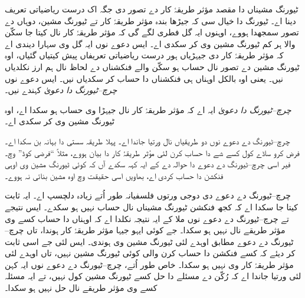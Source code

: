 \documentclass[../../../include/open-logic-section]{subfiles}
\begin{document}

ٹیورنگ مشیناں دا مقصد
مؤثر طریقۂ کار دے تصور
دی جگہ اک درست
ریاضیاتی تعریف دینا اے۔
ٹیورنگ دا خیال سی کہ
جیڑھا بندہ مؤثر طریقۂ کار
تے ٹیورنگ مشین، دوہاں
دے تصور سمجھدا ہووے،
اوہنوں ایہ گل فطری
لگے گی کہ مؤثر
طریقۂ کار نال کیتا
جا سکّن والا ہر
کم ٹیورنگ مشین وی
کر سکدی اے۔
ایس دعوے نوں ایہ گل
وی سہارا دیندی اے
کہ مؤثر طریقۂ کار
دی جیہڑیاں ہور
درست ریاضیاتی تعریفاں
پیش کیتیاں گئیاں،
اوہ ٹیورنگ مشین
دے تصور نال
حساب ہو سکّن والے فنکشناں دے لحاظ
نال ہم ارز نکلدیاں نیں۔ یعنی اوہ بالکل
اوہناں ہی فنکشناں
دا حساب کر سکدیاں
نیں۔ ایس دعوے
نوں \emph{چرچ--ٹیورنگ
دا دعویٰ} کہندے نیں۔

\begin{defn}
\emph{چرچ--ٹیورنگ دا دعویٰ}
ایہ اے کہ مؤثر طریقۂ کار
نال جیہڑا وی حساب ہو سکدا اے،
اوہ ٹیورنگ مشین وی کر سکدی اے۔
\end{defn}

چرچ--ٹیورنگ دے دعوے
نوں دو طریقیاں نال
ورتیا جاندا اے۔
پہلا طریقہ سستی
دا بہانہ بن سکدا اے۔
فرض کرو ساڈے کول
کسے شے دا حساب کرن
لئی مؤثر طریقۂ کار
دا بیان ہووے، مثلاً
“فرضی کوڈ” وچ۔
فیر اسی چرچ--ٹیورنگ
دے دعوے دا حوالہ
دے کے ایہ کہہ
سکدے آں کہ کوئی
ٹیورنگ مشین وی
اوہی فنکشن دا حساب
کردی اے، بھاویں
اسی حقیقت وچ اوہ
مشین بنائی نہ ہووے۔

چرچ--ٹیورنگ دے دعوے
دی دوجی ورتوں فلسفیانہ
طور اُتے زیادہ دلچسپ
اے۔ ایہ ثابت کیتا
جا سکدا اے کہ
کجھ فنکشن ٹیورنگ
مشیناں نال حساب
نہیں ہو سکدے۔
ایس نتیجے تے
چرچ--ٹیورنگ دے
دعوے نوں ملا کے
ایہ نتیجہ نکلدا اے
کہ اوہناں دا حساب
کسے وی مؤثر طریقے نال نہیں
ہو سکدا۔ جے کوئی ایہو جیہا مؤثر
طریقۂ کار ہوندا،
تاں چرچ--ٹیورنگ
دے دعوے مطابق
اوہدے لئی ٹیورنگ
مشین وی ہوندی۔
ایس لئی جے اسی
ثابت کر دیئے کہ
کسے فنکشن دا حساب
کرن والی کوئی
ٹیورنگ مشین نہیں،
تاں اوہدے لئی
مؤثر طریقۂ کار
وی نہیں ہو سکدا۔
خاص طور اُتے،
چرچ--ٹیورنگ دے
دعوے نوں ایہ کہن
لئی ورتیا جاندا اے
کہ رُکّن دے مسئلے دا حل
کسے ٹیورنگ مشین کول نہیں،
تے ایہ مسئلہ کسے وی مؤثر
طریقے نال حل نہیں ہو سکدا۔
\end{document}
